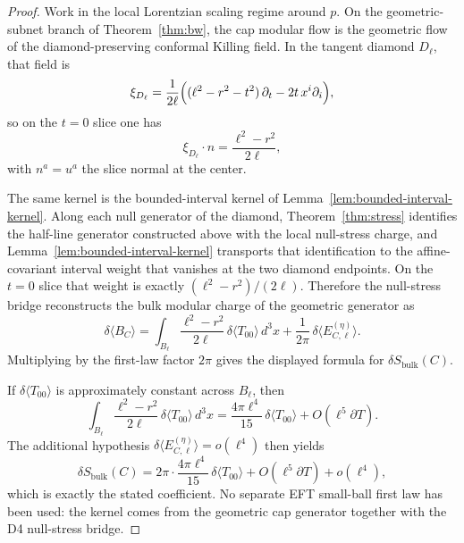 \documentclass[11pt]{article}
\begin{document}
\begin{proof}
Work in the local Lorentzian scaling regime around $p$. On the geometric-subnet branch of Theorem~\ref{thm:bw}, the cap modular flow is the geometric flow of the diamond-preserving conformal Killing field. In the tangent diamond $D_\ell$, that field is
\[
\xi_{D_\ell}
=
\frac{1}{2\ell}
\Bigl((\ell^2-r^2-t^2)\,\partial_t-2t\,x^i\partial_i\Bigr),
\]
so on the $t=0$ slice one has
\[
\xi_{D_\ell}\!\cdot n=\frac{\ell^2-r^2}{2\ell},
\]
with $n^a=u^a$ the slice normal at the center.

The same kernel is the bounded-interval kernel of Lemma~\ref{lem:bounded-interval-kernel}. Along each null generator of the diamond, Theorem~\ref{thm:stress} identifies the half-line generator constructed above with the local null-stress charge, and Lemma~\ref{lem:bounded-interval-kernel} transports that identification to the affine-covariant interval weight that vanishes at the two diamond endpoints. On the $t=0$ slice that weight is exactly $(\ell^2-r^2)/(2\ell)$. Therefore the null-stress bridge reconstructs the bulk modular charge of the geometric generator as
\[
\delta\langle B_C\rangle
=
\int_{B_\ell}\frac{\ell^2-r^2}{2\ell}\,\delta\langle T_{00}\rangle\,d^3x
+\frac{1}{2\pi}\,\delta\langle E^{(\eta)}_{C,\ell}\rangle.
\]
Multiplying by the first-law factor $2\pi$ gives the displayed formula for $\delta S_{\mathrm{bulk}}(C)$.

If $\delta\langle T_{00}\rangle$ is approximately constant across $B_\ell$, then
\[
\int_{B_\ell}\frac{\ell^2-r^2}{2\ell}\,\delta\langle T_{00}\rangle\,d^3x
=
\frac{4\pi\ell^4}{15}\,\delta\langle T_{00}\rangle
+O(\ell^5\partial T).
\]
\noindent
The additional hypothesis $\delta\langle E^{(\eta)}_{C,\ell}\rangle=o(\ell^4)$ then yields
\[
\delta S_{\mathrm{bulk}}(C)
=
2\pi\cdot\frac{4\pi\ell^4}{15}\,\delta\langle T_{00}\rangle
+O(\ell^5\partial T)+o(\ell^4),
\]
which is exactly the stated coefficient. No separate EFT small-ball first law has been used: the kernel comes from the geometric cap generator together with the D4 null-stress bridge.
\end{proof}
\end{document}
